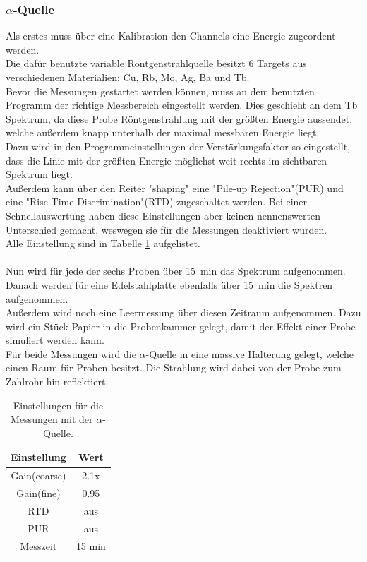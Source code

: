 \documentclass[12pt,a4paper]{article}
\begin{document}
\subsubsection{$\alpha$-Quelle}
Als erstes muss über eine Kalibration den Channels eine Energie zugeordent werden.\\
Die dafür benutzte variable Röntgenstrahlquelle besitzt 6 Targets aus verschiedenen Materialien: Cu, Rb, Mo, Ag, Ba und Tb.\\
Bevor die Messungen gestartet werden können, muss an dem benutzten Programm der richtige Messbereich eingestellt werden. Dies geschieht an dem Tb Spektrum, da diese Probe Röntgenstrahlung mit der größten Energie aussendet, welche außerdem knapp unterhalb der maximal messbaren Energie liegt.\\
Dazu wird in den Programmeinstellungen der Verstärkungsfaktor so eingestellt, dass die Linie mit der größten Energie möglichst weit rechts im sichtbaren Spektrum liegt.\\
Außerdem kann über den Reiter "shaping" eine "Pile-up Rejection"(PUR) und eine "Rise Time Discrimination"(RTD) zugeschaltet werden. Bei einer Schnellauswertung haben diese Einstellungen aber keinen nennenswerten Unterschied gemacht, weswegen sie für die Messungen deaktiviert wurden.\\
Alle Einstellung sind in Tabelle \ref{tab:alpha_Einstellungen} aufgelistet.\\
\\
Nun wird für jede der sechs Proben über \SI{15}{min} das Spektrum aufgenommen.\\
Danach werden für eine Edelstahlplatte ebenfalls über \SI{15}{min} die Spektren aufgenommen.\\
Außerdem wird noch eine Leermessung über diesen Zeitraum aufgenommen. Dazu wird ein Stück Papier in die Probenkammer gelegt, damit der Effekt einer Probe simuliert werden kann.\\
Für beide Messungen wird die $\alpha$-Quelle in eine massive Halterung gelegt, welche einen Raum für Proben besitzt. Die Strahlung wird dabei von der Probe zum Zahlrohr hin reflektiert.
\begin{table}
\centering
\begin{tabular}{|c|c|}
\hline 
Einstellung & Wert \\ 
\hline 
Gain(coarse) & 2.1x \\ 
\hline 
Gain(fine) & 0.95 \\ 
\hline 
RTD & aus \\ 
\hline 
PUR & aus \\ 
\hline 
Messzeit & 15 min \\ 
\hline 
\end{tabular} 
\caption{Einstellungen für die Messungen mit der $\alpha$-Quelle.}
\label{tab:alpha_Einstellungen}
\end{table}
\end{document}
